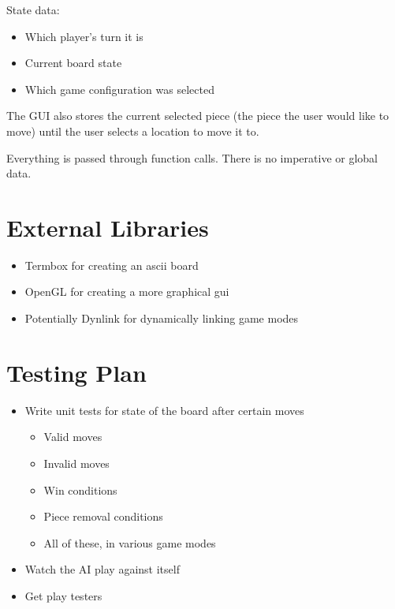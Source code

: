 \documentclass[11pt, oneside]{article}
\begin{document}
State data:
\begin{itemize}
\item Which player's turn it is
\item Current board state
\item Which game configuration was selected
\end{itemize}
The GUI also stores the current selected piece (the piece the user would like to
move) until the user selects a location to move it to.

Everything is passed through function calls. There is no imperative or global
data.

\section{External Libraries}
\begin{itemize}
\item Termbox for creating an ascii board
\item OpenGL for creating a more graphical gui
\item Potentially Dynlink for dynamically linking game modes
\end{itemize}

\section{Testing Plan}
\begin{itemize}
\item Write unit tests for state of the board after certain moves
  \begin{itemize}
  \item Valid moves
  \item Invalid moves
  \item Win conditions
  \item Piece removal conditions
  \item All of these, in various game modes
  \end{itemize}
\item Watch the AI play against itself
\item Get play testers
\end{itemize}
\end{document}
